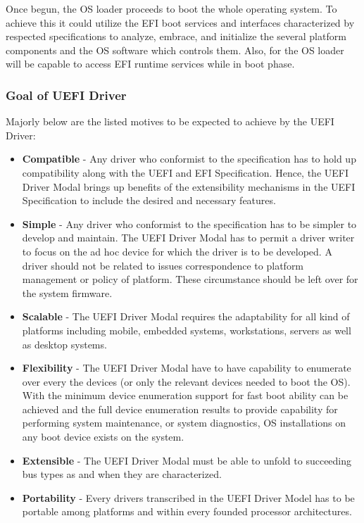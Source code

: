 Once begun, the OS loader proceeds to boot the whole operating system. To achieve this it could utilize the EFI boot services and interfaces characterized by respected specifications to analyze, embrace, and initialize the several platform components and the OS software which controls them. Also, for the OS loader will be capable to access EFI runtime services while in boot phase.

\subsubsection{Goal of UEFI Driver}
Majorly below are the listed motives to be expected to achieve by the UEFI Driver:
\begin{itemize}
	\item \textbf{Compatible} - Any driver who conformist to the specification has to hold up compatibility along with the  UEFI and EFI Specification. Hence, the UEFI Driver Modal brings up benefits of the extensibility mechanisms in the UEFI Specification to include the desired and necessary features.
	\item \textbf{Simple} - Any driver who conformist to the specification has to be simpler to develop and maintain. The UEFI Driver Modal has to permit a driver writer to focus on the ad hoc device for which the driver is to be developed. A driver should not be related to issues correspondence to platform management or policy of platform. These circumstance should be left over for the system firmware.
	\item \textbf{Scalable} - The UEFI Driver Modal requires the adaptability for all kind of platforms including mobile, embedded systems, workstations, servers as well as desktop systems.
	\item \textbf{Flexibility} - The UEFI Driver Modal have to have capability to enumerate over every the devices (or only the relevant devices needed to boot the OS). With the minimum device enumeration support for fast boot ability can be achieved and the full device enumeration results to provide capability for performing system maintenance, or system diagnostics, OS installations on any boot device exists on the system.
	\item \textbf{Extensible} - The UEFI Driver Modal must be able to unfold to succeeding bus types as and when they are characterized.
	\item \textbf{Portability} - Every drivers transcribed in the UEFI Driver Model has to be portable among platforms and within every founded processor architectures.

\end{itemize}
